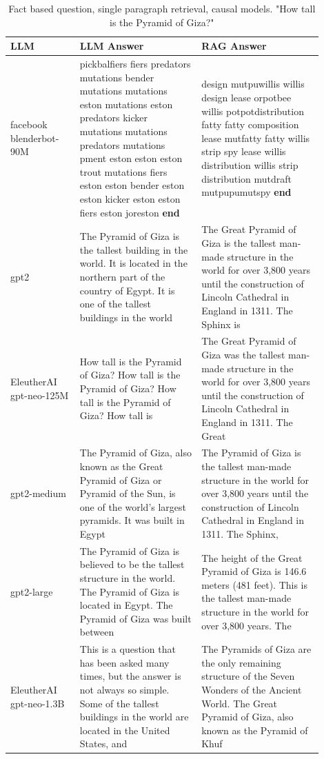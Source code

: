 \documentclass{wseas}
\begin{document}
\begin{table}[htbp]
  \centering
  \caption{Fact based question, single paragraph retrieval, causal models. "How tall is the Pyramid of Giza?"} %
  \label{tab:experiment_R_1_paragraph_Q_fact_M_causal_table}  %
  \begin{tabular}{|p{0.20\linewidth}|p{0.35\linewidth}|p{0.35\linewidth}|}
    \hline
    \textbf{LLM} & \textbf{LLM Answer} & \textbf{RAG Answer} \\ \hline
    facebook blenderbot-90M & pickbalfiers fiers predators mutations bender mutations mutations eston mutations eston predators kicker mutations mutations predators mutations pment eston eston eston trout mutations fiers eston eston bender eston eston kicker eston eston fiers eston joreston \textbf{end} & design mutpuwillis willis design lease orpotbee willis potpotdistribution fatty fatty composition lease mutfatty fatty willis strip spy lease willis distribution willis strip distribution mutdraft mutpupumutspy \textbf{end} \\ \hline
    gpt2 & The Pyramid of Giza is the tallest building in the world. It is located in the northern part of the country of Egypt. It is one of the tallest buildings in the world & The Great Pyramid of Giza is the tallest man-made structure in the world for over 3,800 years until the construction of Lincoln Cathedral in England in 1311. The Sphinx is \\ \hline
    EleutherAI gpt-neo-125M & How tall is the Pyramid of Giza? How tall is the Pyramid of Giza? How tall is the Pyramid of Giza? How tall is & The Great Pyramid of Giza was the tallest man-made structure in the world for over 3,800 years until the construction of Lincoln Cathedral in England in 1311. The Great \\ \hline
    gpt2-medium & The Pyramid of Giza, also known as the Great Pyramid of Giza or Pyramid of the Sun, is one of the world's largest pyramids. It was built in Egypt & The Pyramid of Giza is the tallest man-made structure in the world for over 3,800 years until the construction of Lincoln Cathedral in England in 1311. The Sphinx, \\ \hline
    gpt2-large & The Pyramid of Giza is believed to be the tallest structure in the world. The Pyramid of Giza is located in Egypt. The Pyramid of Giza was built between & The height of the Great Pyramid of Giza is 146.6 meters (481 feet). This is the tallest man-made structure in the world for over 3,800 years. The \\ \hline
    EleutherAI gpt-neo-1.3B & This is a question that has been asked many times, but the answer is not always so simple. Some of the tallest buildings in the world are located in the United States, and & The Pyramids of Giza are the only remaining structure of the Seven Wonders of the Ancient World. The Great Pyramid of Giza, also known as the Pyramid of Khuf \\ \hline
  \end{tabular}
\end{table}
\end{document}
